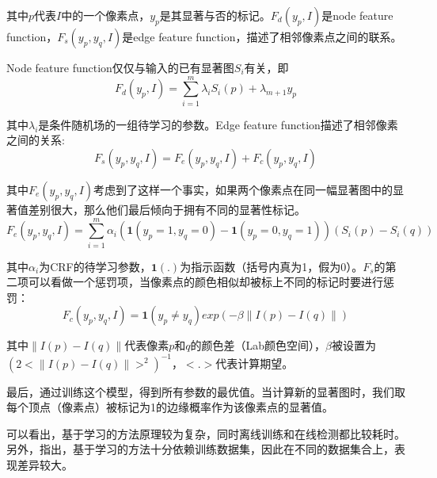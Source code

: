 其中$p$代表$I$中的一个像素点，$y_p$是其显著与否的标记。$F_d(y_p, I)$是node feature function，$F_s(y_p,y_q,I)$是edge feature function，描述了相邻像素点之间的联系。

Node feature function仅仅与输入的已有显著图$S_i$有关，即
\begin{equation}
F_d(y_p, I) = \sum_{i=1}^{m} \lambda_iS_i(p) + \lambda_{m+1}y_p
\end{equation}

其中$\lambda_i$是条件随机场的一组待学习的参数。Edge feature function描述了相邻像素之间的关系:
\begin{equation}
F_s(y_p,y_q,I) = F_e(y_p,y_q,I) + F_c(y_p,y_q,I)
\end{equation}

其中$F_e(y_p,y_q,I)$考虑到了这样一个事实，如果两个像素点在同一幅显著图中的显著值差别很大，那么他们最后倾向于拥有不同的显著性标记。
\begin{equation}
  F_e(y_p,y_q,I) = \sum_{i=1}^{m}\alpha_i(\textbf{1}(y_p=1,y_q=0)-\textbf{1}(y_p=0,y_q=1))(S_i(p)-S_i(q))
\end{equation}

其中$\alpha_i$为CRF的待学习参数，$\textbf{1}(.)$为指示函数（括号内真为1，假为0）。$F_s$的第二项可以看做一个惩罚项，当像素点的颜色相似却被标上不同的标记时要进行惩罚：
\begin{equation}
F_c(y_p,y_q,I)=\textbf{1}(y_p \not= y_q) exp(-\beta \parallel I(p)-I(q) \parallel )
\end{equation}

其中$\parallel I(p)-I(q) \parallel$代表像素$p$和$q$的颜色差（Lab颜色空间），$\beta$被设置为$(2<\parallel I(p)-I(q) \parallel>^2)^{-1}$，$<.>$代表计算期望。

最后，通过训练这个模型，得到所有参数的最优值。当计算新的显著图时，我们取每个顶点（像素点）被标记为1的边缘概率作为该像素点的显著值。

可以看出，基于学习的方法原理较为复杂，同时离线训练和在线检测都比较耗时。另外，\citep{liu2011learning}指出，基于学习的方法十分依赖训练数据集，因此在不同的数据集合上，表现差异较大。

